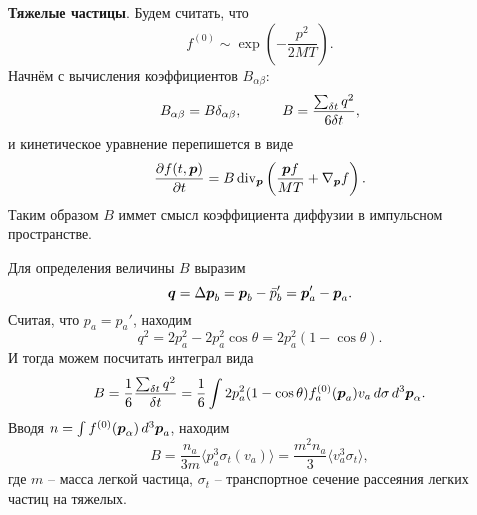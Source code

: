 \textbf{Тяжелые частицы}. Будем считать, что
\begin{equation*}
	f^{(0)} \sim \exp\left(
		- \frac{p^2}{2MT}
	\right).
\end{equation*}
Начнём с вычисления коэффициентов $B_{\alpha \beta}$:
\begin{equation*}
	B_{\alpha \beta} = B \delta_{\alpha \beta},
	\hspace{10 mm} 
	B = \frac{\sum_{\delta t} q^2}{6 \delta t},
\end{equation*}
и кинетическое уравнение перепишется в виде
\begin{equation*}
	\frac{\partial f(t, \boldsymbol{p})}{\partial t} = B \mathop{\mathrm{div}}\nolimits_{\boldsymbol{p}} \left(
		\frac{\boldsymbol{p} f}{MT} + \nabla_{\boldsymbol{p}} f
	\right).
\end{equation*}
Таким образом $B$ иммет смысл коэффициента диффузии в импульсном пространстве. 

Для определения величины $B$ выразим
\begin{equation*}
	\boldsymbol{q} = \Delta \boldsymbol{p}_b = \boldsymbol{p}_b - \bar{p}_b' = \boldsymbol{p}_a' - \boldsymbol{p}_a.
\end{equation*}
Считая, что $p_a = p_a'$, находим
\begin{equation*}
	q^2 = 2 p_a^2 - 2 p_a^2 \cos \theta = 2 p_a^2 (1-\cos \theta).
\end{equation*}
И тогда можем посчитать интеграл вида
\begin{equation*}
	B = \frac{1}{6} \frac{\sum_{\delta t} q^2}{\delta t} = \frac{1}{6} \int 2 p_a^2 (1-\cos \theta) f_a^{(0)} (\boldsymbol{p}_a) v_a \, d \sigma \, d^3 \boldsymbol{p}_\alpha.
\end{equation*}
Вводя $n = \int f^{(0)}(\boldsymbol{p}_\alpha) \, d^3 \boldsymbol{p}_a$, находим
\begin{equation*}
	B = \frac{n_a}{3m} \langle p_a^3 \sigma_t(v_a)\rangle = \frac{m^2 n_a}{3} \langle v_a^3 \sigma_t \rangle,
\end{equation*}
где $m$ -- масса легкой частица, $\sigma_t$ -- транспортное сечение рассеяния легких частиц на тяжелых. 


